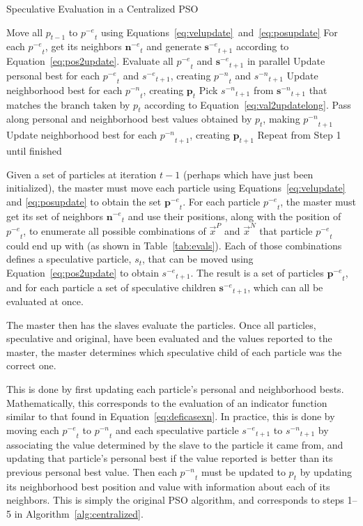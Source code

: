 \documentclass[journal,letterpaper]{IEEEtran}
\newcommand{\alg}[1]{Algorithm~\ref{alg:#1}}
\providecommand{\pers}{\ensuremath{P}}
\providecommand{\neigh}{\ensuremath{N}}
\providecommand{\nbest}{\ensuremath{\Vec{x}^\neigh}}
\providecommand{\pbest}{\ensuremath{\Vec{x}^\pers}}
\providecommand{\noeval}[1]{\ensuremath{#1^{-e}}}
\providecommand{\nonbest}[1]{\ensuremath{#1^{-n}}}
\providecommand{\p}{\ensuremath{p}}
\providecommand{\pset}{\ensuremath{\mathbf{p}}}
\providecommand{\s}{\ensuremath{s}}
\providecommand{\sset}{\ensuremath{\mathbf{s}}}
\providecommand{\nset}{\ensuremath{\mathbf{n}}}
\begin{document}
\begin{algorithm}
  \caption{Speculative Evaluation in a Centralized PSO}
  \label{alg:centralized}
  \begin{algorithmic}[1]
	\STATE Move all $\p_{t-1}$ to $\noeval{\p}_t$ using
	  Equations~\eqref{eq:velupdate}~and~\eqref{eq:posupdate}
	\STATE For each $\noeval{\p}_t$, get its neighbors $\noeval{\nset}_t$ and
	  generate $\noeval{\sset}_{t+1}$ according to
	  Equation~\eqref{eq:pos2update}.
	\STATE Evaluate all $\noeval{\p}_t$ and $\noeval{\sset}_{t+1}$ in parallel
	\STATE Update personal best for each $\noeval{\p}_t$ and
	  $\noeval{\s}_{t+1}$, creating $\nonbest{\p}_t$ and $\nonbest{\s}_{t+1}$
	\STATE Update neighborhood best for each $\nonbest{\p}_t$, creating
	  $\pset_t$
	\FORALL{$\p_t$}
	\STATE Pick $\nonbest{\s}_{t+1}$ from $\nonbest{\sset}_{t+1}$ that matches
	  the branch taken by $\p_t$ according to
	  Equation~\eqref{eq:val2updatelong}.
	\STATE Pass along personal and neighborhood best values obtained by $\p_t$,
	  making $\nonbest{\p}_{t+1}$
	\ENDFOR
	\STATE Update neighborhood best for each $\nonbest{\p}_{t+1}$, creating
	  $\pset_{t+1}$
	\STATE Repeat from Step 1 until finished
  \end{algorithmic}
\end{algorithm}

Given a set of particles at iteration $t-1$ (perhaps which have just been
initialized), the master must move each particle using
Equations~\eqref{eq:velupdate} and \eqref{eq:posupdate} to obtain the set
$\noeval{\pset}_t$.  For each particle $\noeval{\p}_t$, the master must get its
set of neighbors $\noeval{\nset}_t$ and use their positions, along with the
position of $\noeval{\p}_t$, to enumerate all possible combinations of $\pbest$
and $\nbest$ that particle $\noeval{\p}_t$ could end up with (as shown in
Table~\ref{tab:evals}).  Each of those combinations defines a speculative
particle, $\s_t$, that can be moved using Equation~\eqref{eq:pos2update} to
obtain $\noeval{\s}_{t+1}$.  The result is a set of particles
$\noeval{\pset}_t$, and for each particle a set of speculative children
$\noeval{\sset}_{t+1}$, which can all be evaluated at once.

The master then has the slaves evaluate the particles.  Once all particles,
speculative and original, have been evaluated and the values reported to the
master, the master determines which speculative child of each particle was the
correct one.

This is done by first updating each particle's personal and neighborhood bests.
Mathematically, this corresponds to the evaluation of an indicator function
similar to that found in Equation~\eqref{eq:deficasexn}.  In practice, this is
done by moving each $\noeval{\p}_t$ to $\nonbest{\p}_t$ and each speculative
particle $\noeval{\s}_{t+1}$ to $\nonbest{\s}_{t+1}$ by associating the value
determined by the slave to the particle it came from, and updating that
particle's personal best if the value reported is better than its previous
personal best value.  Then each $\nonbest{\p}_t$ must be updated to $\p_t$ by
updating its neighborhood best position and value with information about each
of its neighbors.  This is simply the original PSO algorithm, and corresponds
to steps 1--5 in \alg{centralized}.
\end{document}
